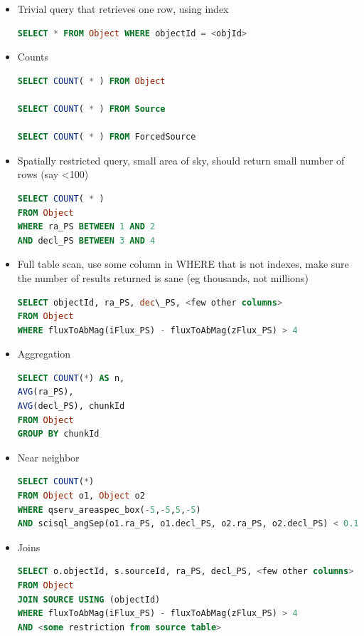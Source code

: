 \documentclass[DM,toc]{lsstdoc}
\begin{document}
\begin{itemize}
\item
  Trivial query that retrieves one row, using index

\begin{lstlisting}[language=SQL]
SELECT * FROM Object WHERE objectId = <objId>
\end{lstlisting}

\item
  Counts

\begin{lstlisting}[language=SQL]
SELECT COUNT( * ) FROM Object

SELECT COUNT( * ) FROM Source

SELECT COUNT( * ) FROM ForcedSource
\end{lstlisting}

\item
  Spatially restricted query, small area of sky, should return small
  number of rows (say \textless{}100)

\begin{lstlisting}[language=SQL]
SELECT COUNT( * )
FROM Object
WHERE ra_PS BETWEEN 1 AND 2
AND decl_PS BETWEEN 3 AND 4
\end{lstlisting}

\item
  Full table scan, use some column in WHERE that is not indexes, make
  sure the number of results returned is sane (eg thousands, not
  millions)

\begin{lstlisting}[language=SQL]
SELECT objectId, ra_PS, dec\_PS, <few other columns>
FROM Object
WHERE fluxToAbMag(iFlux_PS) - fluxToAbMag(zFlux_PS) > 4
\end{lstlisting}

\item
  Aggregation

\begin{lstlisting}[language=SQL]
SELECT COUNT(*) AS n,
AVG(ra_PS),
AVG(decl_PS), chunkId
FROM Object
GROUP BY chunkId
\end{lstlisting}

\item
  Near neighbor

\begin{lstlisting}[language=SQL]
SELECT COUNT(*)
FROM Object o1, Object o2
WHERE qserv_areaspec_box(-5,-5,5,-5)
AND scisql_angSep(o1.ra_PS, o1.decl_PS, o2.ra_PS, o2.decl_PS) < 0.1
\end{lstlisting}


\item
  Joins

\begin{lstlisting}[language=SQL]
SELECT o.objectId, s.sourceId, ra_PS, decl_PS, <few other columns>
FROM Object
JOIN SOURCE USING (objectId)
WHERE fluxToAbMag(iFlux_PS) - fluxToAbMag(zFlux_PS) > 4
AND <some restriction from source table>
\end{lstlisting}

\end{itemize}


\end{document}
